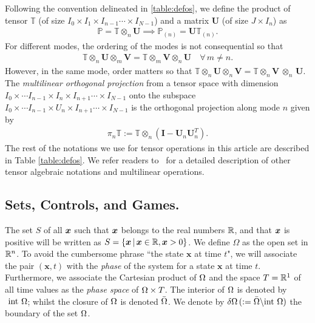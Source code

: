 Following the convention delineated in \autoref{table:defos}, we define the product of tensor $\mathds{T}$ (of size $I_0 \times I_1 \times I_{n-1} \cdots \times I_{N-1}$) and a matrix $\mathbf{U}$ (of size $J \times I_n$) as
%
\begin{align}
	\mathds{P} = \mathds{T} \otimes_n \mathbf{U} \implies \mathds{P}_{(n)} = \mathbf{U}  \mathds{T}_{(n)}.
	\label{eq:ttm}
\end{align}
%
For different modes, the ordering of the modes is not consequential so that 
%
\begin{align}
	\mathds{T} \otimes_n \mathbf{U} \otimes_m \mathbf{V} = \mathds{T} \otimes_m \mathbf{V} \otimes_n \mathbf{U} \quad \forall \, m \neq n.
\end{align}
%
However, in the same mode, order matters so that $\mathds{T} \otimes_n \mathbf{U} \otimes_n \mathbf{V} = \mathds{T} \otimes_n \mathbf{V} \, \otimes_n \, \mathbf{U}$. The \textit{multilinear orthogonal projection} from a tensor space with dimension ${I_0 \times \cdots I_{n-1}  \times I_n \times I_{n+1} \cdots \times I_{N-1}}$ onto the subspace ${I_0 \times \cdots I_{n-1}  \times U_n \times I_{n+1} \cdots \times I_{N-1}}$ is the orthogonal projection along mode $n$ given by
%
\begin{align}
	\pi_n \mathds{T} := \mathds{T}\otimes_n \left(\mathbf{I}-\mathbf{U}_n \mathbf{U}_n^T \right).
\end{align}
%
The rest of the notations we use for tensor operations in this article are described in Table \ref{table:defos}. We refer readers to~\cite{Kolda2009, VannieuwenhovenTruncate2012} for a detailed description of other tensor algebraic notations and multilinear operations. 

\subsection{Sets, Controls, and Games.}
%
\noindent The set $S$ of all $\bm{x}$ such that $\bm{x}$ belongs to the real numbers  $\mathbb{R}$, and that $\bm{x}$ is positive will be written as $S=\{\bm{x}\,|\, \bm{x} \in \mathbb{R}, \bm{x} >0\}$. We define $\Omega$ as the open set in $\mathbb{R}^n$.  To avoid the cumbersome phrase ``the state $\bm{x}$ at time $t$", we will associate the pair $(\bm{x}, t)$ with the \textit{phase} of the system for a state $\bm{x}$ at time $t$. Furthermore, we associate the Cartesian product of $\Omega$ and the space $T =\mathbb{R}^1$ of all time values as the \textit{phase space} of $\Omega \times T$. The interior of $\Omega$ is denoted by $\text{ int } \Omega$; whilst the closure of $\Omega$ is denoted $\bar{\Omega}$. We denote by $\delta \Omega \,(:= \bar{\Omega} \backslash \text{int } \Omega)$ the boundary of the set $\Omega$. 

